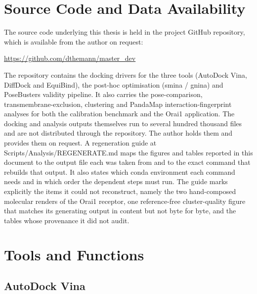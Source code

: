 \appendix

\hypertarget{source-code-and-data-availability}{%
\chapter{Source Code and Data Availability}\label{source-code-and-data-availability}}

The source code underlying this thesis is held in the project GitHub repository, which is available from the author on request:

\begin{center}
\url{https://github.com/dthemann/master_dev}
\end{center}

\noindent The repository contains the docking drivers for the three tools (AutoDock Vina, DiffDock and EquiBind), the post-hoc optimisation (smina / gnina) and PoseBusters validity pipeline. It also carries the pose-comparison, transmembrane-exclusion, clustering and PandaMap interaction-fingerprint analyses for both the calibration benchmark and the Orai1 application. The docking and analysis outputs themselves run to several hundred thousand files and are not distributed through the repository. The author holds them and provides them on request. A regeneration guide at Scripts/Analysis/REGENERATE.md maps the figures and tables reported in this document to the output file each was taken from and to the exact command that rebuilds that output. It also states which conda environment each command needs and in which order the dependent steps must run. The guide marks explicitly the items it could not reconstruct, namely the two hand-composed molecular renders of the Orai1 receptor, one reference-free cluster-quality figure that matches its generating output in content but not byte for byte, and the tables whose provenance it did not audit.

\hypertarget{tools-and-functions}{%
\chapter{Tools and Functions}\label{tools-and-functions}}

\hypertarget{autodock-vina-1}{%
\section{AutoDock Vina}\label{autodock-vina-1}}

